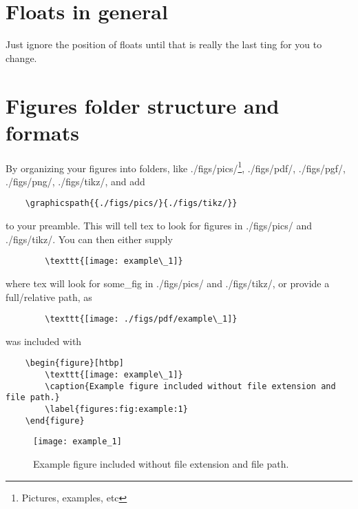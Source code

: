 \section{Floats in general}
Just ignore the position of floats until that is really the last ting for you to change.

\section{Figures folder structure and formats}

By organizing your figures into folders, like
./figs/pics/\footnote{Pictures, examples, etc}, ./figs/pdf/, ./figs/pgf/, ./figs/png/, ./figs/tikz/, and add
    
    \begin{verbatim}
    \graphicspath{{./figs/pics/}{./figs/tikz/}}
    \end{verbatim}

    to your preamble. This will tell tex to look for figures in ./figs/pics/ and ./figs/tikz/.
    You can then either supply

    \begin{verbatim}
        \texttt{[image: example\_1]}
    \end{verbatim}

    where tex will look for some\_fig in ./figs/pics/ and ./figs/tikz/, or provide a full/relative path, as

    \begin{verbatim}
        \texttt{[image: ./figs/pdf/example\_1]}
    \end{verbatim}

            

 was included with 


\begin{verbatim}
    \begin{figure}[htbp]
        \texttt{[image: example\_1]}
        \caption{Example figure included without file extension and file path.}
        \label{figures:fig:example:1}
    \end{figure}
\end{verbatim}


\begin{figure}[htbp]
    \texttt{[image: example\_1]}
    \caption{Example figure included without file extension and file path.}
    \label{figures:fig:example:1}
\end{figure}

